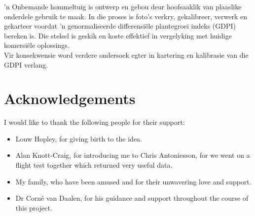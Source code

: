 'n Onbemande hommeltuig is ontwerp en gebou deur hoofsaaklik van plaaslike onderdele gebruik te maak. In die proses is foto's verkry, gekalibreer, verwerk en gekarteer voordat 'n genormaliseerde differensiële plantegroei indeks (GDPI) bereken is. Die stelsel is geskik en koste effektief in vergelyking met huidige komersiële oplossings.\\

Vir konsekwensie word verdere ondersoek egter in kartering en kalibrasie van die GDPI verlang.

\chapter{Acknowledgements}

I would like to thank the following people for their support:
\begin{itemize}
    \item Louw Hopley, for giving birth to the idea.
    \item Alan Knott-Craig, for introducing me to Chris Antoniesson, for we went on a flight test together which returned very useful data.
    \item My family, who have been amused and for their unwavering love and support.
    \item Dr Corné van Daalen, for his guidance and support throughout the course of this project.
\end{itemize}

\cleardoublepage
\tableofcontents

\clearpage
\label{listoffigures}
\listoffigures




